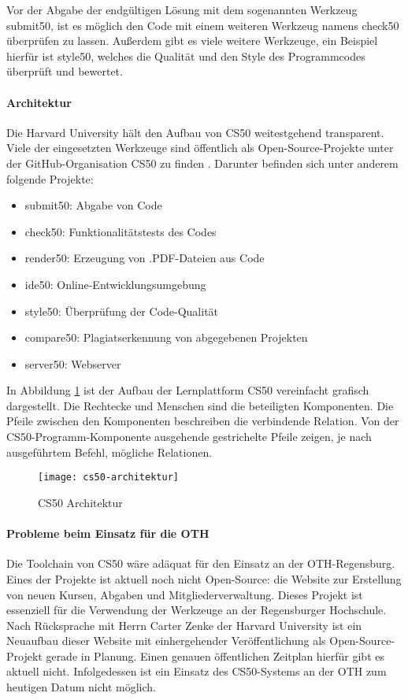 Vor der Abgabe der endgültigen Lösung mit dem sogenannten Werkzeug
\glqq submit50\grqq{}, ist es möglich den Code mit einem weiteren Werkzeug
namens \glqq check50\grqq{} überprüfen zu lassen. Außerdem gibt es viele weitere
Werkzeuge, ein Beispiel hierfür ist \glqq style50\grqq{}, welches die Qualität
und den Style des Programmcodes überprüft und bewertet. \parencite{submit50}

\paragraph{Architektur}
Die Harvard University hält den Aufbau von CS50 weitestgehend transparent.
Viele der eingesetzten Werkzeuge sind öffentlich als Open-Source-Projekte unter
der GitHub-Organisation \glqq CS50\grqq{} zu finden \parencite{cs50-github}. Darunter
befinden sich unter anderem folgende Projekte:
\begin{itemize}
\item submit50: Abgabe von Code
\item check50: Funktionalitätstests des Codes
\item render50: Erzeugung von .PDF-Dateien aus Code
\item ide50: Online-Entwicklungsumgebung
\item style50: Überprüfung der Code-Qualität
\item compare50: Plagiatserkennung von abgegebenen Projekten
\item server50: Webserver
\end{itemize}

\newpage

In Abbildung \ref{fig:cs50-architektur} ist der Aufbau der Lernplattform CS50
vereinfacht grafisch dargestellt. Die Rechtecke und Menschen sind die
beteiligten Komponenten. Die Pfeile zwischen den Komponenten beschreiben die
verbindende Relation. Von der \glqq CS50-Programm\grqq-Komponente ausgehende gestrichelte Pfeile zeigen, je nach ausgeführtem Befehl, mögliche Relationen.

\begin{figure}[h]
    \centering
    \texttt{[image: cs50-architektur]}
    \caption{CS50 Architektur}
    \label{fig:cs50-architektur}
\end{figure}

\paragraph{Probleme beim Einsatz für die OTH}
Die Toolchain von CS50 wäre adäquat für den Einsatz an der OTH-Regensburg.
Eines der Projekte ist aktuell noch nicht Open-Source: die Website zur
Erstellung von neuen Kursen, Abgaben und Mitgliederverwaltung. Dieses Projekt
ist essenziell für die Verwendung der Werkzeuge an der Regensburger Hochschule.
Nach Rücksprache mit Herrn Carter Zenke der Harvard University ist ein Neuaufbau
dieser Website mit einhergehender Veröffentlichung als Open-Source-Projekt
gerade in Planung. Einen genauen öffentlichen Zeitplan hierfür gibt es aktuell
nicht. Infolgedessen ist ein Einsatz des CS50-Systems an der OTH zum heutigen
Datum nicht möglich.

